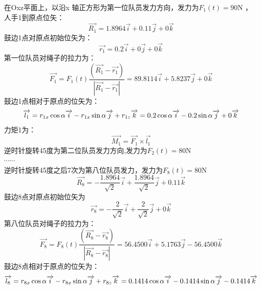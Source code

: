 \documentclass[UTF8]{article}
\begin{document}
在Oxz平面上，以沿x 轴正方形为第一位队员发力方向，发力为$F_{1}(t)=90$N ，人手1到原点位矢：
\begin{equation}
\overrightarrow{R_{1}}=1.8964\overrightarrow{i}+0.11\overrightarrow{j}+0\overrightarrow{k}
\end{equation}
鼓边1点对原点初始位矢为：
\begin{equation}
\overrightarrow{r_{1}}=0.2\overrightarrow{i}+0\overrightarrow{j}+0\overrightarrow{k}
\end{equation}
第一位队员对绳子的拉力为：
\begin{equation}
\overrightarrow{F_{1}}=F_{1}(t)\frac{(\overrightarrow{R_{1}}-\overrightarrow{r_{1}})}{\left |\overrightarrow{R_{1}}-\overrightarrow{r_{1}}\right|}=89.8114\overrightarrow{i}+5.8237\overrightarrow{j}+0\overrightarrow{k}
\end{equation}
鼓边1点相对于原点的位矢为：
\begin{equation}
\overrightarrow{l_{1}}=r_{1x}\cos\alpha\overrightarrow{i}-r_{1x}\sin\alpha\overrightarrow{j}+r_{1z}\overrightarrow{k}\\
=0.2\cos\alpha\overrightarrow{i}-0.2\sin\alpha\overrightarrow{j}+0\overrightarrow{k}
\end{equation}
力矩1为：
\begin{equation}
\overrightarrow{M_1}=\overrightarrow{F_{1}}\times\overrightarrow{l_{1}}
\end{equation}
逆时针旋转45度为第二位队员发力方向,发力为$F_{2}(t)=80$N\\
$\cdots\cdots$\\
逆时针旋转45度之后7次为第八位队员发力，发力为$F_{8}(t)=80$N
\begin{equation}
\overrightarrow{R_{8}}=-\frac{1.8964}{\sqrt{2}}\overrightarrow{i}+\frac{1.8964}{\sqrt{2}}\overrightarrow{j}+0.11\overrightarrow{k}
\end{equation}
鼓边8点对原点初始位矢为
\begin{equation}
\overrightarrow{r_{8}}=-\frac{2}{\sqrt{2}}\overrightarrow{i}+\frac{2}{\sqrt{2}}\overrightarrow{j}+0\overrightarrow{k}
\end{equation}
第八位队员对绳子的拉力为：
\begin{equation}
\overrightarrow{F_{8}}=F_{8}(t)\frac{(\overrightarrow{R_{8}}-\overrightarrow{r_{8}})}{\left|\overrightarrow{R_{8}}-\overrightarrow{r_{8}}\right|}=56.4500\overrightarrow{i}+5.1763\overrightarrow{j}-56.4500\overrightarrow{k}
\end{equation}
鼓边8点相对于原点的位矢为：
\begin{equation}
\overrightarrow{l_{8}}=r_{8x}\cos\alpha\overrightarrow{i}-r_{8x}\sin\alpha\overrightarrow{j}+r_{8z}\overrightarrow{k}\\
=0.1414\cos\alpha\overrightarrow{i}-0.1414\sin\alpha\overrightarrow{j}-0.1414\overrightarrow{k}
\end{equation}
\end{document}
